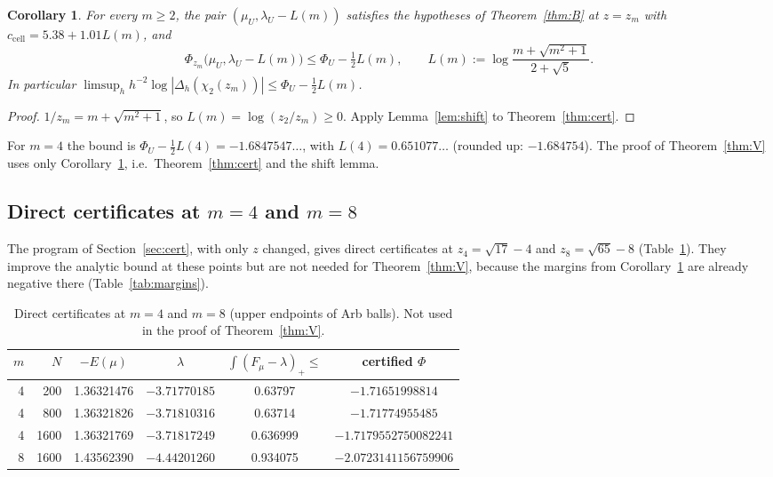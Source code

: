 \documentclass[11pt]{amsart}
\newtheorem{corollary}[theorem]{Corollary}
\theoremstyle{definition}
\theoremstyle{remark}
\numberwithin{equation}{section}
\newcommand{\ccell}{c_{\mathrm{cell}}}
\begin{document}
\begin{corollary}\label{cor:shift}
For every $m\ge2$, the pair $(\mu_U,\lambda_U-L(m))$ satisfies the hypotheses of Theorem~\ref{thm:B} at $z=z_m$ with
$\ccell=5.38+1.01L(m)$, and
\[
  \Phi_{z_m}\bigl(\mu_U,\lambda_U-L(m)\bigr)\le\Phi_U-\tfrac12L(m),\qquad L(m):=\log\frac{m+\sqrt{m^2+1}}{2+\sqrt5}.
\]
In particular $\limsup_hh^{-2}\log|\Delta_h(\chi_2(z_m))|\le\Phi_U-\frac12L(m)$.
\end{corollary}

\begin{proof}
$1/z_m=m+\sqrt{m^2+1}$, so $L(m)=\log(z_2/z_m)\ge0$. Apply Lemma~\ref{lem:shift} to Theorem~\ref{thm:cert}.
\end{proof}

For $m=4$ the bound is $\Phi_U-\frac12L(4)=-1.6847547\ldots$, with $L(4)=0.651077\ldots$ (rounded up:
$-1.684754$). The proof of Theorem~\ref{thm:V} uses only
Corollary~\ref{cor:shift}, i.e.\ Theorem~\ref{thm:cert} and the shift lemma.

\subsection{Direct certificates at \texorpdfstring{$m=4$}{m = 4} and \texorpdfstring{$m=8$}{m = 8}}\label{sec:certV}
The program of Section~\ref{sec:cert}, with only $z$ changed, gives direct certificates at $z_4=\sqrt{17}-4$ and
$z_8=\sqrt{65}-8$ (Table~\ref{tab:certV}). They improve the analytic bound at these points but are not needed for
Theorem~\ref{thm:V}, because the margins from Corollary~\ref{cor:shift} are already negative there
(Table~\ref{tab:margins}).

\begin{table}[ht]
\centering\small
\begin{tabular}{@{}rrcccc@{}}
\toprule
$m$ & $N$ & $-E(\mu)$ & $\lambda$ & $\int(F_\mu-\lambda)_+\le$ & certified $\Phi$\\
\midrule
4 & 200 & 1.36321476 & $-3.71770185$ & 0.63797 & $-1.71651998814$\\
4 & 800 & 1.36321826 & $-3.71810316$ & 0.63714 & $-1.71774955485$\\
4 & 1600 & 1.36321769 & $-3.71817249$ & 0.636999 & $-1.7179552750082241$\\
8 & 1600 & 1.43562390 & $-4.44201260$ & 0.934075 & $-2.0723141156759906$\\
\bottomrule
\end{tabular}
\caption{Direct certificates at $m=4$ and $m=8$ (upper endpoints of Arb balls). Not used in the proof of
Theorem~\ref{thm:V}.}\label{tab:certV}
\end{table}
\end{document}
